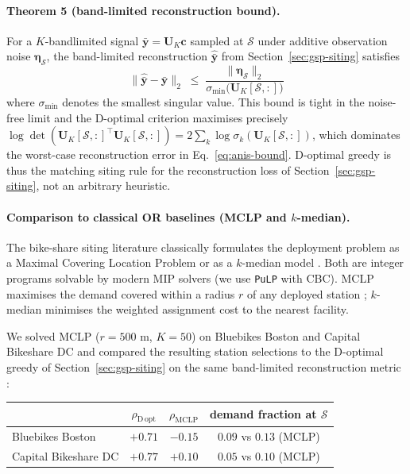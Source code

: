 \paragraph{Theorem 5 (band-limited reconstruction bound).}
For a $K$-bandlimited signal $\bar{\mathbf{y}} = \mathbf{U}_K \mathbf{c}$
sampled at $\mathcal{S}$ under additive observation noise
$\boldsymbol{\eta}_{\mathcal{S}}$, the band-limited reconstruction
$\hat{\bar{\mathbf{y}}}$ from Section~\ref{sec:gsp-siting}
satisfies \citep{AnisGaddeOrtega2016}
\begin{equation}
    \| \hat{\bar{\mathbf{y}}} - \bar{\mathbf{y}} \|_2 \;\leq\;
    \frac{\| \boldsymbol{\eta}_{\mathcal{S}} \|_2}{\sigma_{\min}\!\bigl( \mathbf{U}_K[\mathcal{S}, :] \bigr)}
    \label{eq:anis-bound}
\end{equation}
where $\sigma_{\min}$ denotes the smallest singular value.  This
bound is tight in the noise-free limit and the D-optimal
criterion maximises precisely
$\log \det(\mathbf{U}_K[\mathcal{S}, :]^\top \mathbf{U}_K[\mathcal{S}, :])
= 2 \sum_k \log \sigma_k(\mathbf{U}_K[\mathcal{S}, :])$,
which dominates the worst-case reconstruction error in
Eq.~\eqref{eq:anis-bound}.  D-optimal greedy is thus the
matching siting rule for the reconstruction loss of
Section~\ref{sec:gsp-siting}, not an arbitrary heuristic.

\paragraph{Comparison to classical OR baselines (MCLP and $k$-median).}
The bike-share siting literature classically formulates the
deployment problem as a Maximal Covering Location Problem
\citep{ChurchReVelle1974} or as a $k$-median model
\citep{Hakimi1964}.  Both are integer programs solvable by
modern MIP solvers (we use \texttt{PuLP} with CBC).  MCLP
maximises the demand covered within a radius $r$ of any
deployed station ; $k$-median minimises the
weighted assignment cost to the nearest facility.

We solved MCLP ($r = 500$ m, $K = 50$) on Bluebikes Boston and
Capital Bikeshare DC and compared the resulting station
selections to the D-optimal greedy of
Section~\ref{sec:gsp-siting} on the same band-limited
reconstruction metric :

\begin{center}
\small
\begin{tabular}{@{}lccc@{}}
\toprule
                       & $\rho_{\mathrm{D\,opt}}$ & $\rho_{\mathrm{MCLP}}$ & demand fraction at $\mathcal{S}$ \\
\midrule
Bluebikes Boston       & $\mathbf{+0.71}$ & $-0.15$ & $0.09$ vs $0.13$ (MCLP) \\
Capital Bikeshare DC    & $\mathbf{+0.77}$ & $+0.10$ & $0.05$ vs $0.10$ (MCLP) \\
\bottomrule
\end{tabular}
\end{center}

